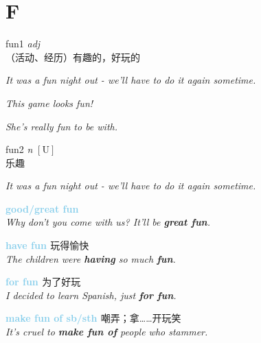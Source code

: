 \section{F}
\item[] {
    \lettrine{fun}{1}  
    \textit{adj} \\
    （活动、经历）有趣的，好玩的

    \textit{It was a fun night out - we'll have to do it again sometime.}

    \textit{This game looks fun!}

    \textit{She's really fun to be with.}
  
} 
\item[] {
    \lettrine{fun}{2}  
    \textit{n} 
    $\mathrm{[U]}$ \\
    乐趣

    \textit{It was a fun night out - we'll have to do it again sometime.}

    \textbf {
        \textcolor{SkyBlue} {
            good/great fun
        }
    } \\
    \textit{Why don't you come with us? It'll be \textbf{great fun}.}

    \textbf {
        \textcolor{SkyBlue} {
            have fun
        }
    } 
    玩得愉快 \\
    \textit{The children were \textbf{having} so much \textbf{fun}.}

    \textbf {
        \textcolor{SkyBlue} {
            for fun
        }
    }  
    为了好玩 \\
    \textit{I decided to learn Spanish, just \textbf{for fun}.}
    
    \textbf {
        \textcolor{SkyBlue} {
            make \textprimstress fun of sb/sth
        }
    }  
    嘲弄；拿……开玩笑 \\
    \textit{It's cruel to \textbf{make fun of} people who stammer.}
} 
